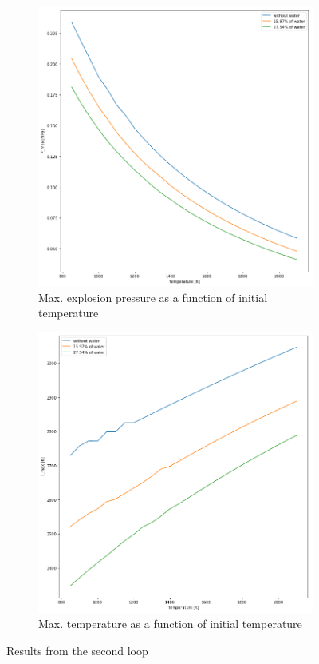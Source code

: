 \documentclass[a4paper]{article}
\begin{document}
\begin{figure}[H]
    \centering
    \begin{subfigure}[h]{0.4\textwidth}
        \includegraphics[width=\textwidth]{2_Pmax_to_T_2.png}
        	\caption{Max. explosion pressure as a function of initial temperature}
        \label{fig:2_1}
    \end{subfigure}
    \qquad
    \begin{subfigure}[h]{0.4\textwidth}
        \includegraphics[width=\textwidth]{2_Tmax_to_T.png}
        	\caption{Max. temperature as a function of initial temperature}
        \label{fig:2_2}
    \end{subfigure}
    \caption{Results from the second loop}\label{fig:2}
\end{figure}
\end{document}
